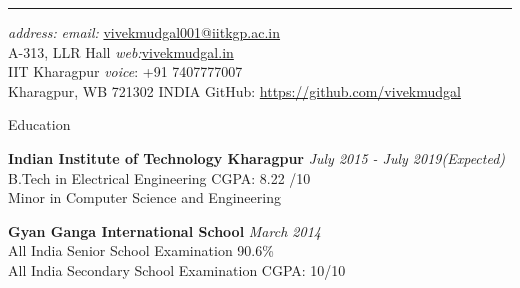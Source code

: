 \documentclass{resume} %
\begin{document}
\hrule
\vspace{0.5 em}
{\em address:} \hfill {\textit{ email:} \href{mailto:vivekmudgal001@iitkgp.ac.in}{vivekmudgal001@iitkgp.ac.in} }\\
A-313, LLR Hall \hfill {	\textit{web:}\href{vivekmudgal.in}{vivekmudgal.in} }  \\
IIT Kharagpur \hfill {\textit{voice}: +91 7407777007} \\
Kharagpur, WB 721302 INDIA	\hfill {GitHub: \href{https://github.com/vivekmudgal}{https://github.com/vivekmudgal}} \\



\begin{rSection}{Education}

{\bf Indian Institute of Technology Kharagpur} \hfill {\em July 2015 - July 2019(Expected)} 
\\ B.Tech in Electrical Engineering \hfill { CGPA: 8.22 /10}
\\ Minor in Computer Science and Engineering


\vspace{0.5 em}

{\bf Gyan Ganga International School} \hfill {\em March 2014}
\\ All India Senior School Examination \hfill {90.6\%}
\\ All India Secondary School Examination \hfill {CGPA: 10/10}



\end{rSection}



\end{document}
